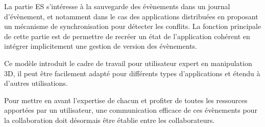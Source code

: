 La partie \gls{ES} s'intéresse à la sauvegarde des évènements dans un journal 
d'évènement, et notamment dans le cas des applications distribuées en proposant 
un mécanisme de synchronisation pour détecter les conflits. La fonction principale 
de cette partie est de permettre de recréer un état de l'application cohérent en 
intégrer implicitement une gestion de version des évènements.

Ce modèle introduit le cadre de travail pour utilisateur expert en manipulation 3D, il 
peut être facilement adapté pour différents types d'applications et étendu à 
d'autres utilisations. 

Pour mettre en avant l'expertise de chacun et profiter de 
toutes les ressources apportées par un utilisateur, une communication efficace de 
ces évènements pour la collaboration doit désormais être établie entre les 
collaborateurs.